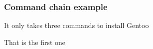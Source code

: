 \begin{frame}[fragile]
\frametitle{Command chain example}
    It only takes \alert{three commands} to install Gentoo
    \pause
      
    \pause
\alert{That is the first one}
\end{frame}
